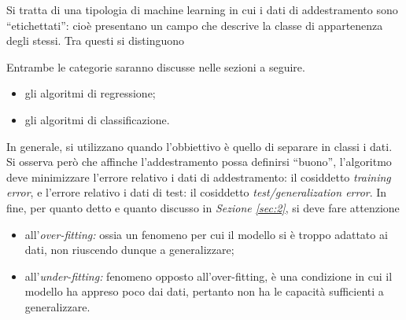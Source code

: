 \documentclass{subfiles}
\begin{document}
Si tratta di una tipologia di machine learning in cui i dati di addestramento sono ``etichettati'':
cioè presentano un campo che descrive la classe di appartenenza degli stessi.
Tra questi si distinguono
\begin{MarginNote}
    Entrambe le categorie saranno discusse nelle sezioni a seguire.
\end{MarginNote}
\begin{itemize}
    \item gli algoritmi di regressione;
    \item gli algoritmi di classificazione.
\end{itemize}
In generale, si utilizzano quando l'obbiettivo è quello di separare in classi i dati.
Si osserva però che affinche l'addestramento possa definirsi ``buono'', l'algoritmo deve minimizzare l'errore relativo i dati di addestramento:
il cosiddetto \emph{training error}, e l'errore relativo i dati di test: il cosiddetto \emph{test/generalization error}.
In fine, per quanto detto e quanto discusso in \emph{Sezione \ref{sec:2}}, si deve fare attenzione
\begin{itemize}
    \item all'\emph{over-fitting:} ossia un fenomeno per cui il modello si è troppo adattato ai dati, non riuscendo dunque a generalizzare;
    \item all'\emph{under-fitting:} fenomeno opposto all'over-fitting, è una condizione in cui il modello ha appreso poco dai dati,
          pertanto non ha le capacità sufficienti a generalizzare.
\end{itemize}
\end{document}
